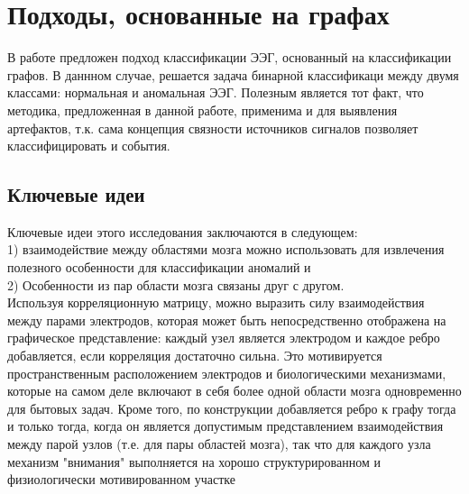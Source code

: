 \documentclass[12pt, a4paper, titlepage]{extreport}
\begin{document}
	\section*{Подходы, основанные на графах}
	В работе \cite{29} предложен подход классификации ЭЭГ, основанный на классификации графов. В даннном случае, решается задача бинарной классификаци между двумя классами: нормальная и аномальная ЭЭГ. Полезным является тот факт, что методика, предложенная в данной работе, применима и для выявления артефактов, т.к. сама концепция связности источников сигналов позволяет классифицировать и события.
	\subsection*{Ключевые идеи}
	Ключевые идеи этого исследования заключаются в следующем: \\
	1) взаимодействие
	между областями мозга можно использовать для извлечения полезного
	особенности для классификации аномалий и\\
	2) Особенности из пар области мозга связаны друг с другом.\\
	Используя корреляционную матрицу, можно выразить силу взаимодействия между парами электродов, которая может быть непосредственно отображена на графическое представление: каждый узел является электродом и каждое ребро добавляется, если корреляция достаточно сильна. Это мотивируется пространственным расположением электродов и биологическими механизмами, которые на самом деле включают в себя более одной области мозга одновременно для бытовых задач. Кроме того, по конструкции добавляется ребро к графу тогда и только тогда, когда он является допустимым представлением взаимодействия между парой узлов (т.е. для пары областей мозга), так что для каждого узла механизм "внимания" выполняется на хорошо структурированном и физиологически мотивированном участке\\
\end{document}
